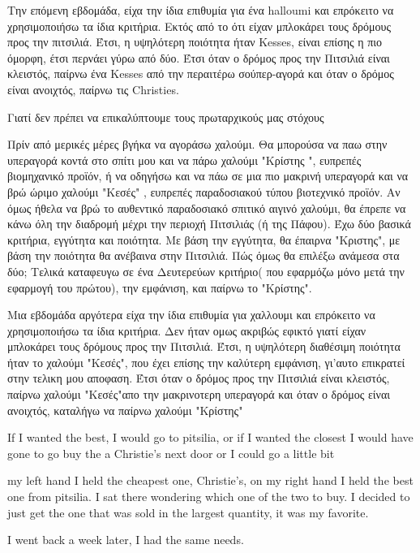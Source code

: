 \documentclass[12pt]{report}
\numberwithin{equation}{section}
\begin{document}
Την επόμενη εβδομάδα, είχα την ίδια επιθυμία για ένα halloumi και επρόκειτο να χρησιμοποιήσω τα ίδια κριτήρια. Εκτός από το ότι είχαν μπλοκάρει τους δρόμους προς την πιτσιλιά. Έτσι, η υψηλότερη ποιότητα ήταν Kesses, είναι επίσης η πιο όμορφη, έτσι περνάει γύρω από δύο. Έτσι όταν ο δρόμος προς την Πιτσιλιά είναι κλειστός, παίρνω ένα Kesses από την περαιτέρω σούπερ-αγορά και όταν ο δρόμος είναι ανοιχτός, παίρνω τις Christies.


Γιατί δεν πρέπει να επικαλύπτουμε τους πρωταρχικούς μας στόχους 

Πρίν από μερικές μέρες βγήκα  να αγοράσω χαλούμι. Θα μπορούσα να παω  στην  υπεραγορά  κοντά στο σπίτι μου και να πάρω χαλούμι "Κρίστης ", ευπρεπές βιομηχανικό προϊόν,  ή να οδηγήσω και να πάω σε μια πιο μακρινή υπεραγορά και να βρώ ώριμο χαλούμι "Κεσές" , ευπρεπές παραδοσιακού τύπου βιοτεχνικό προϊόν. Αν όμως ήθελα να βρώ το αυθεντικό παραδοσιακό σπιτικό αιγινό χαλούμι, θα έπρεπε  να κάνω όλη την διαδρομή μέχρι την περιοχή Πιτσιλιάς (ή της Πάφου). Έχω δύο βασικά κριτήρια, εγγύτητα και ποιότητα. Με βάση την εγγύτητα, θα έπαιρνα "Κριστης",  με βάση την ποιότητα θα ανέβαινα στην Πιτσιλιά.  Πώς όμως θα επιλέξω ανάμεσα στα δύο; Τελικά καταφευγω σε ένα Δευτερεύων κριτήριο( που εφαρμόζω μόνο μετά την εφαρμογή του πρώτου), την εμφάνιση, και παίρνω το "Κρίστης". 

Μια εβδομάδα αργότερα είχα την ίδια επιθυμία για χαλλουμι και  επρόκειτο να χρησιμοποιήσω τα ίδια κριτήρια. Δεν ήταν ομως ακριβώς εφικτό γιατί είχαν μπλοκάρει τους δρόμους προς την Πιτσιλιά. Έτσι, η υψηλότερη διαθέσιμη ποιότητα ήταν το χαλούμι "Κεσές", που έχει επίσης την καλύτερη εμφάνιση, γι'αυτο επικρατεί στην τελικη μου αποφαση. 
 Έτσι όταν ο δρόμος προς την Πιτσιλιά είναι κλειστός, παίρνω χαλούμι "Κεσές"απο την μακρινοτερη υπεραγορά και όταν ο δρόμος είναι ανοιχτός, καταλήγω να παίρνω χαλούμι "Κρίστης"




If I wanted the best, I would go to pitsilia, or if I wanted the closest I would have gone to go buy the a Christie's next door or I could go a little bit

 my left hand I held the cheapest one, Christie's, on my right hand I held the best one from pitsilia. I sat there wondering which one of the two to buy. I decided to just get the one that was sold in the largest quantity, it was my favorite. 

I went back a week later, I had the same needs. 

 


\end{document}
